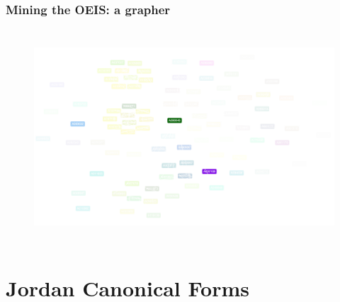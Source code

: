 \documentclass[9pt]{beamer}
\begin{document}
\begin{frame}[fragile]
\frametitle{Mining the OEIS: a grapher}
\begin{figure}
\includegraphics[width=12cm,height=8cm]{coloured}

\end{figure}
\end{frame}


\iffalse
\section{Jordan Canonical Forms}
\end{document}
